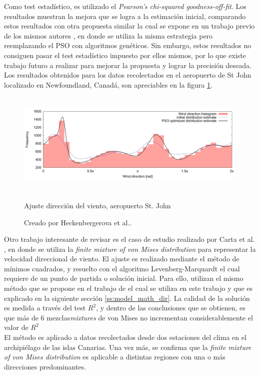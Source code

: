 Como test estadístico, es utilizado el \emph{Pearson's chi-squared goodness-off-fit}. Los resultados muestran la mejora que se logra a la estimación inicial, comparando estos resultados con otra propuesta similar la cual se expone en un trabajo previo de los mismos autores \cite{Heckenbergerova13}, en donde se utiliza la misma estrategia pero reemplazando el PSO con algoritmos genéticos. Sin embargo, estos resultados no consiguen pasar el test estadístico impuesto por ellos mismos, por lo que existe trabajo futuro  a realizar para mejorar la propuesta y lograr la precisión deseada.\\
Los resultados obtenidos para los datos recolectados en el aeropuerto de St John localizado en Newfoundland, Canadá, son apreciables en la figura \ref{fig:dir_pso}.
\begin{figure}[h!]
    \centering    
    \includegraphics[height=50mm]{figures/dir_pso.png} 
    \caption{Ajuste dirección del viento, aeropuerto St. John}
    \vspace{-.25cm} 
    \caption*{Creado por Heckenbergerova et al.\cite{Heckenbergerova15}.}
    \label{fig:dir_pso}
\end{figure}

Otro trabajo interesante de revisar es el caso de estudio realizado por Carta et al. \cite{Carta07}, en donde se utiliza la \emph{finite mixture of von Mises distribution} para representar la velocidad direccional de viento. El ajuste es realizado mediante el método de mínimos cuadrados, y resuelto con el algoritmo Levenberg-Marquardt \cite{Gavin16} el cual requiere de un punto de partida o solución inicial. Para ello, utilizan el mismo método que se propone en el trabajo de \cite{Heckenbergerova13} el cual se utiliza en este trabajo y que es explicado en la siguiente sección \ref{ss:model_math_dir}. La calidad de la solución es medida a través del test $R^2$, y dentro de las conclusiones que se obtienen, es que más de 6 mezclas\emph{mixtures} de von Mises no incrementan considerablemente el valor de $R^2$\\
El método es aplicado a datos recolectados desde dos estaciones del clima en el archipiélago de las islas Canarias. Una vez más, se confirma que la \emph{finite mixture of von Mises distribution} es aplicable a distintas regiones con una o más direcciones predominantes. 